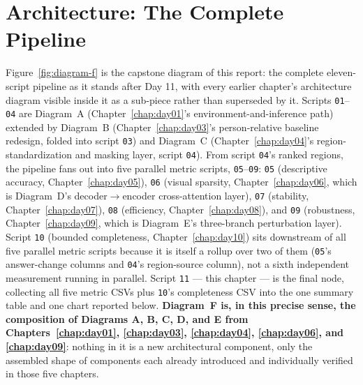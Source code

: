 \section{Architecture: The Complete Pipeline}

Figure~\ref{fig:diagram-f} is the capstone diagram of this report: the complete eleven-script
pipeline as it stands after Day 11, with every earlier chapter's architecture diagram visible
inside it as a sub-piece rather than superseded by it. Scripts \texttt{01}--\texttt{04} are
Diagram~A (Chapter~\ref{chap:day01}'s environment-and-inference path) extended by
Diagram~B (Chapter~\ref{chap:day03}'s person-relative baseline redesign, folded into script
\texttt{03}) and Diagram~C (Chapter~\ref{chap:day04}'s region-standardization and masking
layer, script \texttt{04}). From script \texttt{04}'s ranked regions, the pipeline fans out
into five parallel metric scripts, \texttt{05}--\texttt{09}: \texttt{05} (descriptive accuracy,
Chapter~\ref{chap:day05}), \texttt{06} (visual sparsity, Chapter~\ref{chap:day06}, which is
Diagram~D's decoder$\to$encoder cross-attention layer), \texttt{07} (stability,
Chapter~\ref{chap:day07}), \texttt{08} (efficiency, Chapter~\ref{chap:day08}), and \texttt{09}
(robustness, Chapter~\ref{chap:day09}, which is Diagram~E's three-branch perturbation layer).
Script \texttt{10} (bounded completeness, Chapter~\ref{chap:day10}) sits downstream of all five
parallel metric scripts because it is itself a rollup over two of them (\texttt{05}'s
answer-change columns and \texttt{04}'s region-source column), not a sixth independent
measurement running in parallel. Script \texttt{11} --- this chapter --- is the final node,
collecting all five metric CSVs plus \texttt{10}'s completeness CSV into the one summary table
and one chart reported below. \textbf{Diagram~F is, in this precise sense, the composition of
Diagrams A, B, C, D, and E from Chapters~\ref{chap:day01}, \ref{chap:day03},
\ref{chap:day04}, \ref{chap:day06}, and \ref{chap:day09}}: nothing in it is a new architectural
component, only the assembled shape of components each already introduced and individually
verified in those five chapters.

